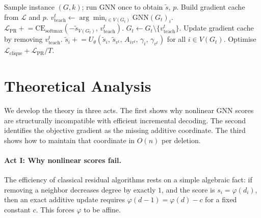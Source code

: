 \documentclass[11pt]{article}
\theoremstyle{plain}
\theoremstyle{remark}
\begin{document}
\begin{algorithm}[t]
  \caption{PR Training Step}
  \label{alg:pr_training}
  \begin{algorithmic}[1]
    \State Sample instance $(G, k)$; run GNN once to obtain $\tilde{s}$, $p$.
    \State Build gradient cache from $\mathcal{L}$ and $p$. \hfill{}
    \State $v^t_{\mathrm{teach}} \leftarrow \arg\min_{i \in V(G_t)} \mathrm{GNN}(G_t)_i$. \hfill{}
    \State $\mathcal{L}_{\mathrm{PR}} \mathrel{+}= \mathrm{CE}_{\mathrm{softmax}}(-\tilde{s}_{V(G_t)},\, v^t_{\mathrm{teach}})$. \hfill{}
    \State $G_t \leftarrow G_t \setminus \{v^t_{\mathrm{teach}}\}$.
    \State Update gradient cache by removing $v^t_{\mathrm{teach}}$. \hfill{}
    \State $\tilde{s}_i \mathrel{+}= U_\theta(\tilde{s}_i,\, \tilde{s}_{v^t},\, A_{iv^t},\, \gamma_i,\, \gamma_{v^t})$ for all $i \in V(G_t)$.
    \EndFor
    \State Optimise $\mathcal{L}_{\mathrm{clique}} + \mathcal{L}_{\mathrm{PR}} / T$.
  \end{algorithmic}
\end{algorithm}

\section{Theoretical Analysis}
\label{sec:theory}

We develop the theory in three acts. The first shows why nonlinear GNN scores are
structurally incompatible with efficient incremental decoding. The second identifies
the objective gradient as the missing additive coordinate. The third shows how to
maintain that coordinate in $O(n)$ per deletion.

\paragraph{Act I: Why nonlinear scores fail.}
The efficiency of classical residual algorithms rests on a simple algebraic fact: if
removing a neighbor decreases degree by exactly $1$, and the score is $s_i =
\varphi(d_i)$, then an exact additive update requires $\varphi(d-1) = \varphi(d) - c$
for a fixed constant $c$. This forces $\varphi$ to be affine.
\end{document}
